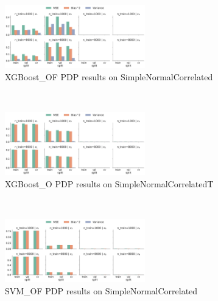 \documentclass[runningheads]{llncs}
\begin{document}
\begin{figure}[h!]
    \ContinuedFloat\
    \centering
    \begin{subfigure}[b]{\textwidth}
        \centering
        \includegraphics[width=0.67\textwidth]{img/SNC-all/feature_effect_errors_pdp_XGBoost_OF.png}
        \caption{XGBoost\_OF PDP results on SimpleNormalCorrelated}
    \end{subfigure}
    \\[10pt]
    \vfill
    \begin{subfigure}[b]{\textwidth}
        \centering
        \includegraphics[width=0.67\textwidth]{img/SNC-all/feature_effect_errors_pdp_XGBoost_OT.png}
        \caption{XGBoost\_O PDP results on SimpleNormalCorrelatedT}
    \end{subfigure}
    \\[10pt]
    \vfill
    \begin{subfigure}[b]{\textwidth}
        \centering
        \includegraphics[width=0.67\textwidth]{img/SNC-all/feature_effect_errors_pdp_SVM_OF.png}
        \caption{SVM\_OF PDP results on SimpleNormalCorrelated}
    \end{subfigure}
    \\[10pt]
    \vfill
    \begin{subfigure}[b]{\textwidth}

\end{subfigure}
\end{figure}
\end{document}
